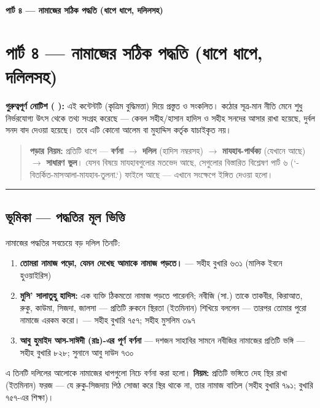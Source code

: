 

\begin{center}{\Large\bfseries\color{emerald} পার্ট ৪ — নামাজের সঠিক পদ্ধতি (ধাপে ধাপে, দলিলসহ)}\end{center}
\vspace{1em}
\section*{পার্ট ৪ — নামাজের সঠিক পদ্ধতি (ধাপে ধাপে, দলিলসহ)}

\begin{warnbox}
 \textbf{গুরুত্বপূর্ণ নোটিশ ( ):} এই কন্টেন্টটি  (কৃত্রিম বুদ্ধিমত্তা) দিয়ে প্রস্তুত ও সংকলিত।  কঠোর সূত্র-মান নীতি মেনে শুধু নির্ভরযোগ্য উৎস থেকে তথ্য সংগ্রহ করেছে — কেবল সহীহ/হাসান হাদিস ও সহীহ সনদের আসার রাখা হয়েছে, দুর্বল সনদ বাদ দেওয়া হয়েছে। তবে এটি কোনো আলেম বা মুহাদ্দিস কর্তৃক যাচাইকৃত নয়।
\end{warnbox}


\begin{quote}
\textbf{পড়ার নিয়ম:} প্রতিটি ধাপে — \textbf{বর্ণনা} $\rightarrow$ \textbf{দলিল} (হাদিস নম্বরসহ) $\rightarrow$ \textbf{মাযহাব-পার্থক্য} (যেখানে আছে) $\rightarrow$ \textbf{সাধারণ ভুল}। যেসব বিষয়ে মাযহাবগুলোর মতভেদ আছে, সেগুলোর বিস্তারিত বিশ্লেষণ পার্ট ৬ (`-বিতর্কিত-মাসআলা-মাযহাব-তুলনা.`) ফাইলে আছে — এখানে সংক্ষেপে ইঙ্গিত দেওয়া হলো।
\end{quote}


\medskip\hrule\medskip

\subsection*{ভূমিকা — পদ্ধতির মূল ভিত্তি}

নামাজের পদ্ধতির সবচেয়ে বড় দলিল তিনটি:

\begin{enumerate}
\item \textbf{তোমরা নামাজ পড়ো, যেমন দেখেছ আমাকে নামাজ পড়তে।} — সহীহ বুখারি ৬৩১ (মালিক ইবনে হুওয়াইরিস)
\item \textbf{মুসি' সালাতুহু হাদিস:} এক ব্যক্তি ঠিকমতো নামাজ পড়তে পারেননি; নবীজি (সা.) তাকে তাকবীর, কিরাআত, রুকু, কাউমা, সিজদা, জালসা — প্রতিটি রুকনে স্থিরতা (ইতমিনান) শিখিয়ে বললেন — তারপর তোমার পুরো নামাজে এরকম করো। — সহীহ বুখারি ৭৫৭; সহীহ মুসলিম ৩৯৭
\item \textbf{আবু হুমাইদ আস-সাঈদী (রাঃ)-এর পূর্ণ বর্ণনা} — দশজন সাহাবির সামনে নবীজির নামাজের প্রতিটি ভঙ্গি — সহীহ বুখারি ৮২৮; সুনানে আবু দাউদ ৭৩০
\end{enumerate}
এ তিনটি দলিলের আলোকে নামাজের ধাপগুলো নিচে বর্ণনা করা হলো। \textbf{নিয়ম:} প্রতিটি ভঙ্গিতে দেহ স্থির রাখা (ইতমিনান) ফরজ — যে রুকু-সিজদায় পিঠ সোজা করে স্থির থাকে না, তার নামাজ বাতিল (সহীহ বুখারি ৭৯১; বুখারি ৭৫৭-এর শিক্ষা)।

